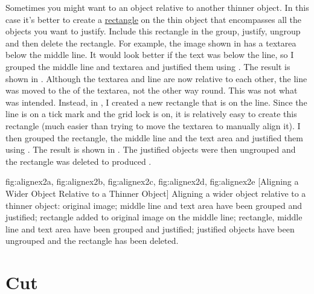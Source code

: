  Sometimes you might want to  an
\gls{object} relative to another thinner object. In this case it's
better to create a \hyperref[sec:rectangles]{rectangle}
 on the thin object that encompasses all the objects
you want to justify.  Include this rectangle in the \gls{group},
justify, ungroup and then delete the rectangle. For example, the
image shown in  has a \gls{textarea} below
the middle line. It would look better if the text was
 below the line, so I grouped the middle line and
\gls{textarea} and justified them using
. The result is shown in
. Although the \gls{textarea} and line are
now  relative to each other, the line was moved to
the  of the \gls{textarea}, not the other way round.
This was not what was intended. Instead, in
, I created a new rectangle that is
 on the line. Since the line is on a tick mark and
the grid lock is on, it is relatively easy to create this rectangle
(much easier than trying to move the \gls{textarea} to manually
align it). I then grouped the rectangle, the middle line and the
text area and justified them using .
The result is shown in . The justified
objects were then ungrouped and the rectangle was deleted to
produced .

{
  {fig:alignex2a}{}{},
  {fig:alignex2b}{}{},
  {fig:alignex2c}{}{},
  {fig:alignex2d}{}{},
  {fig:alignex2e}{}{}
}
[Aligning a Wider Object Relative to a Thinner Object]
{Aligning a wider object relative to a thinner object:
 original image;
 middle line and text area have
been grouped and justified;
 rectangle added to original
image  on the middle line;
 rectangle, middle line
and text area have been grouped and justified;
 justified
objects have been ungrouped and the rectangle has been deleted.}


\section{Cut}\label{sec:cutobjects}

